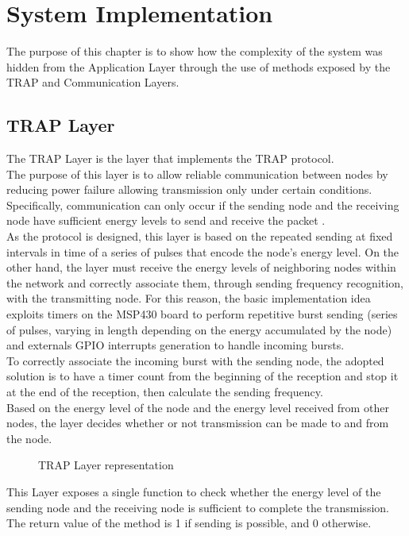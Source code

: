 \chapter{System Implementation}
\label{cha:communicationStack}
The purpose of this chapter is to show how the complexity of the system was hidden from the Application Layer through the use of methods exposed by the TRAP and Communication Layers.
\section{TRAP Layer}
\label{sec:TRAPLayer}
The TRAP Layer is the layer that implements the TRAP protocol.\\
The purpose of this layer is to allow reliable communication between nodes by reducing power failure allowing transmission only under certain conditions. Specifically, communication can only occur if the sending node and the receiving node have sufficient energy levels to send and receive the packet \cite{9733918}.\\
As the protocol is designed, this layer is based on the repeated sending at fixed intervals in time of a series of pulses that encode the node's energy level. On the other hand, the layer must receive the energy levels of neighboring nodes within the network and correctly associate them, through sending frequency recognition, with the transmitting node. For this reason, the basic implementation idea exploits timers on the MSP430 board to perform repetitive burst sending (series of pulses, varying in length depending on the energy accumulated by the node) and externals GPIO interrupts generation to handle incoming bursts.\\
To correctly associate the incoming burst with the sending node, the adopted solution is to have a timer count from the beginning of the reception and stop it at the end of the reception, then calculate the sending frequency.\\
Based on the energy level of the node and the energy level received from other nodes, the layer decides whether or not transmission can be made to and from the node.\\
\begin{figure}[H]
\centerline{}
\caption{\footnotesize \centering TRAP Layer representation}
\label{fig:TRAPLayerDiagram}
\end{figure}
This Layer exposes a single function to check whether the energy level of the sending node and the receiving node is sufficient to complete the transmission. The return value of the method is 1 if sending is possible, and 0 otherwise.

